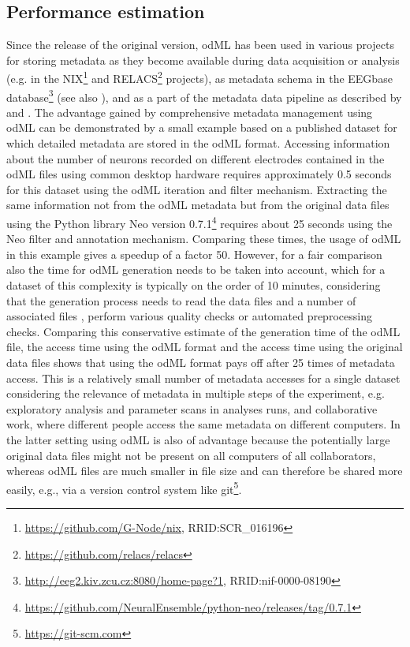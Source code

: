 \subsection{Performance estimation}
Since the release of the original version, odML has been used in various projects for storing metadata as they become available during data acquisition or analysis (e.g. in the NIX\footnote{\url{https://github.com/G-Node/nix}, RRID:SCR\_016196} and RELACS\footnote{\url{https://github.com/relacs/relacs}} projects), as metadata schema in the EEGbase database\footnote{\url{http://eeg2.kiv.zcu.cz:8080/home-page?1}, RRID:nif-0000-08190} (see also \citealp{Moucek_2014}), and as a part of the metadata data pipeline as described by \cite{Zehl_2016} and \cite{Brochier_2018}. The advantage gained by comprehensive metadata management using odML can be demonstrated by a small example based on a published dataset \citep{Brochier_2018} for which detailed metadata are stored in the odML format. Accessing information about the number of neurons recorded on different electrodes contained in the odML files using common desktop hardware requires approximately 0.5 seconds for this dataset using the odML iteration and filter mechanism. Extracting the same information not from the odML metadata but from the original data files using the Python library Neo version 0.7.1\footnote{\url{https://github.com/NeuralEnsemble/python-neo/releases/tag/0.7.1}} requires about 25 seconds using the Neo filter and annotation mechanism. Comparing these times, the usage of odML in this example gives a speedup of a factor 50. However, for a fair comparison also the time for odML generation needs to be taken into account, which for a dataset of this complexity is typically on the order of 10 minutes, considering that the generation process needs to read the data files and a number of associated files \citep{Zehl_2016}, perform various quality checks or automated preprocessing checks. Comparing this conservative estimate of the generation time of the odML file, the access time using the odML format and the access time using the original data files shows that using the odML format pays off after 25 times of metadata access. This is a relatively small number of metadata accesses for a single dataset considering the relevance of metadata in multiple steps of the experiment, e.g. exploratory analysis and parameter scans in analyses runs, and collaborative work, where different people access the same metadata on different computers. In the latter setting using odML is also of advantage because the potentially large original data files might not be present on all computers of all collaborators, whereas odML files are much smaller in file size and can therefore be shared more easily, e.g., via a version control system like git\footnote{\url{https://git-scm.com}}.

